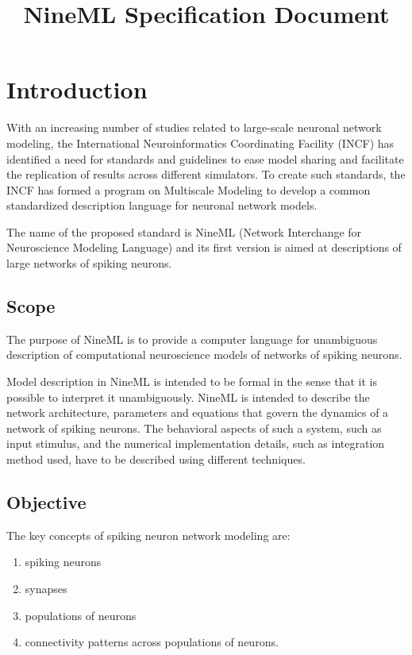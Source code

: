 \documentclass[a4paper]{article}
\begin{document}
\title{NineML Specification Document}

\newpage
\pagestyle{plain}

\tableofcontents

\section{Introduction}

With an increasing number of studies related to large-scale neuronal
network modeling, the International Neuroinformatics Coordinating
Facility (INCF) has identified a need for standards and guidelines to
ease model sharing and facilitate the replication of results across
different simulators. To create such standards, the INCF has formed a
program on Multiscale Modeling to develop a common standardized
description language for neuronal network models.

The name of the proposed standard is NineML (Network Interchange for
Neuroscience Modeling Language) and its first version is aimed at
descriptions of large networks of spiking neurons.

\subsection{Scope}

The purpose of NineML is to provide a computer language for
unambiguous description of computational neuroscience models of
networks of spiking neurons.

Model description in NineML is intended to be formal in the sense that
it is possible to interpret it unambiguously.  NineML is intended to
describe the network architecture, parameters and equations that
govern the dynamics of a network of spiking neurons. The behavioral
aspects of such a system, such as input stimulus, and the numerical
implementation details, such as integration method used, have to be
described using different techniques.

\subsection{Objective}

The key concepts of spiking neuron network modeling are:

\begin{enumerate}
\item spiking neurons
\item synapses 
\item populations of neurons 
\item connectivity patterns across populations of neurons. 
\end{enumerate}
\end{document}
